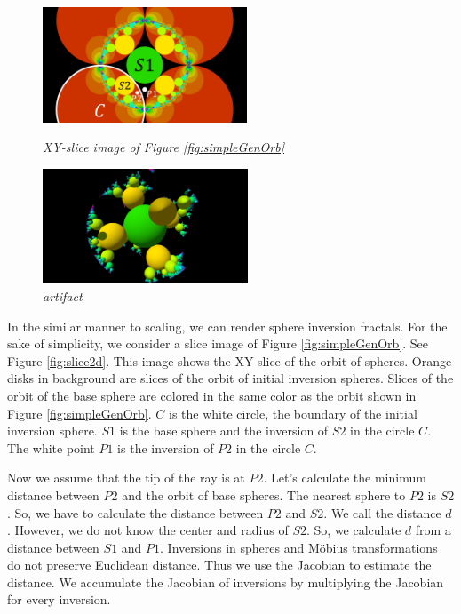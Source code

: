\begin{figure}[htbp]
 \begin{minipage}[t]{0.5\hsize}
  \center
  \includegraphics[height=1.35in, keepaspectratio]{img/preparation/slice.png}
  \caption{\textit{XY-slice image of Figure \ref{fig:simpleGenOrb}}}
  \label{fig:slice2d}
  \hspace*{\fill}
 \end{minipage}
 \begin{minipage}[t]{0.5\hsize}
  \center
  \includegraphics[height=1.35in, keepaspectratio]{img/preparation/artifact.pdf}
  \caption{\textit{artifact}}
  \label{fig:3dartifact}
  \hspace*{\fill}
 \end{minipage}
\end{figure}

In the similar manner to scaling, we can render sphere inversion
fractals.
For the sake of simplicity, we consider a slice image of Figure
\ref{fig:simpleGenOrb}.
See Figure \ref{fig:slice2d}. This image shows the XY-slice of the orbit
of spheres.
Orange disks in background  are slices of the orbit of initial inversion spheres.
Slices of the orbit of the base sphere are colored in
the same color as the orbit shown in Figure \ref{fig:simpleGenOrb}.
$C$ is the white circle, the boundary of the initial inversion sphere.
$S1$ is the base sphere and the inversion of $S2$ in the circle $C$. 
The white point $P1$ is the inversion of $P2$ in the circle $C$.

Now we assume that the tip of the ray is at $P2$.
Let’s calculate the minimum distance between
$P2$ and the orbit of base spheres.
The nearest sphere to $P2$ is $S2$.
So, we have to calculate the distance between $P2$ and $S2$.
We call the distance $d$.
However, we do not know the center and radius of $S2$.
So, we calculate $d$ from a distance between $S1$ and $P1$.
Inversions in spheres and M\"obius transformations do not preserve
Euclidean distance.
Thus we use the Jacobian to estimate the distance.
We accumulate the Jacobian of inversions by multiplying the Jacobian for
every inversion.

